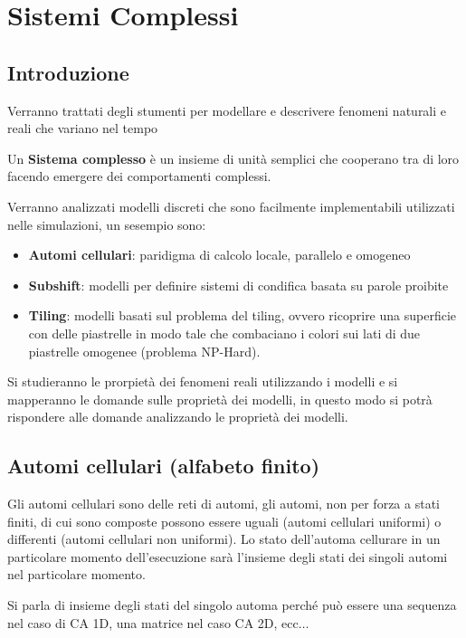 \chapter{Sistemi Complessi}
\section{Introduzione}
Verranno trattati degli stumenti per modellare e descrivere fenomeni naturali e reali
che variano nel tempo
\begin{definizione}
    Un \textbf{Sistema complesso} è un insieme di unità semplici che cooperano tra
    di loro facendo emergere dei comportamenti complessi.
\end{definizione}
Verranno analizzati modelli discreti che sono facilmente implementabili utilizzati
nelle simulazioni, un sesempio sono:
\begin{itemize}
    \item \textbf{Automi cellulari}: paridigma di calcolo locale, parallelo e omogeneo
    \item \textbf{Subshift}: modelli per definire sistemi di condifica basata su
          parole proibite
    \item \textbf{Tiling}: modelli basati sul problema del tiling, ovvero ricoprire
          una superficie con delle piastrelle in modo tale che combaciano i colori sui
          lati di due piastrelle omogenee (problema NP-Hard).
\end{itemize}

Si studieranno le prorpietà dei fenomeni reali utilizzando i modelli e si mapperanno
le domande sulle proprietà dei modelli, in questo modo si potrà rispondere alle
domande analizzando le proprietà dei modelli.

\section{Automi cellulari (alfabeto finito)}
Gli automi cellulari sono delle reti di automi, gli automi, non per forza a stati
finiti, di cui sono composte possono essere uguali (automi cellulari uniformi) o differenti (automi cellulari non
uniformi). Lo stato dell'automa cellurare in un particolare momento dell'esecuzione
sarà l'insieme degli stati dei singoli automi nel particolare momento.

\begin{nota}
    Si parla di insieme degli stati del singolo automa perché può essere una
    sequenza nel caso di CA 1D, una matrice nel caso CA 2D, ecc$\dots$
\end{nota}

